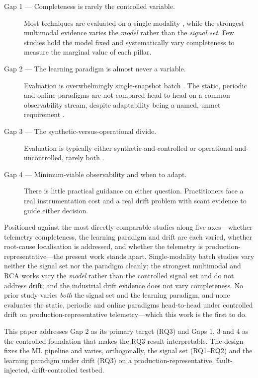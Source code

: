 \documentclass[pdflatex,sn-mathphys-num]{sn-jnl}%
\theoremstyle{thmstyleone}%
\theoremstyle{thmstyletwo}%
\theoremstyle{thmstylethree}%
\begin{document}
\begin{description}
  \item[Gap 1 --- Completeness is rarely the controlled variable.] Most techniques are evaluated on a single modality \cite{lomio2022,mart2020}, while the strongest multimodal evidence \cite{han2024} varies the \emph{model} rather than the \emph{signal set}. Few studies hold the model fixed and systematically vary completeness to measure the marginal value of each pillar.
  \item[Gap 2 --- The learning paradigm is almost never a variable.] Evaluation is overwhelmingly single-snapshot batch \cite{lomio2022,dkmak2025,han2024}. The static, periodic and online paradigms are not compared head-to-head on a common observability stream, despite adaptability being a named, unmet requirement \cite{raeiszadeh2026}.
  \item[Gap 3 --- The synthetic-versus-operational divide.] Evaluation is typically either synthetic-and-controlled or operational-and-uncontrolled, rarely both \cite{hrusto2026,islam2021}.
  \item[Gap 4 --- Minimum-viable observability and when to adapt.] There is little practical guidance on either question. Practitioners face a real instrumentation cost \cite{leadingobs,kosinska2023} and a real drift problem \cite{islam2021} with scant evidence to guide either decision.
\end{description}

Positioned against the most directly comparable studies along five axes---whether telemetry completeness, the learning paradigm and drift are each varied, whether root-cause localisation is addressed, and whether the telemetry is production-representative---the present work stands apart. Single-modality batch studies \cite{lomio2022,mart2020} vary neither the signal set nor the paradigm cleanly; the strongest multimodal and RCA works \cite{dkmak2025,han2024,wang2018,chen2025,pedroso2025} vary the \emph{model} rather than the controlled signal set and do not address drift; and the industrial drift evidence \cite{islam2021} does not vary completeness. No prior study varies \emph{both} the signal set and the learning paradigm, and none evaluates the static, periodic and online paradigms head-to-head under controlled drift on production-representative telemetry---which this work is the first to do.

This paper addresses Gap 2 as its primary target (RQ3) and Gaps 1, 3 and 4 as the controlled foundation that makes the RQ3 result interpretable. The design fixes the ML pipeline and varies, orthogonally, the signal set (RQ1--RQ2) and the learning paradigm under drift (RQ3) on a production-representative, fault-injected, drift-controlled testbed.
\end{document}
